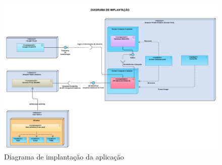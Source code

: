 \begin{figure}[htb]
  \centering
  \includegraphics[width=\textwidth]{cap04-desenvolvimento/images/4-3-2-2-diagrama-implantacao}
  \caption{Diagrama de implantação da aplicação}
  \label{fig:diagrama-implantacao}
\end{figure}

